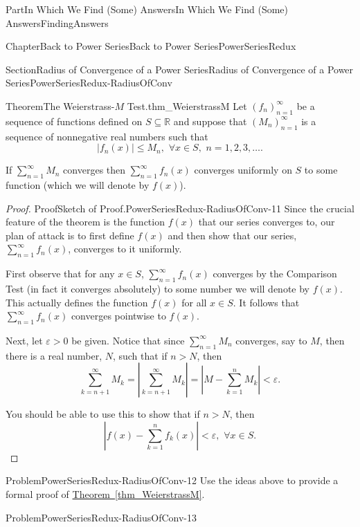 \documentclass[oneside,10pt,]{book}
\newcommand{\xreffont}{\relax}
\numberwithin{equation}{part}
\newcommand{\abs}[1]{\left|#1\right|}
\newcommand{\eps}{\varepsilon}
\newcommand{\RR}{\mathbb {R}}
\newcommand{\lt}{<}
\begin{document}
\begin{partptx}{Part}{In Which We Find (Some) Answers}{}{In Which We Find (Some) Answers}{}{}{FindingAnswers}
\begin{chapterptx}{Chapter}{Back to Power Series}{}{Back to Power Series}{}{}{PowerSeriesRedux}
\begin{sectionptx}{Section}{Radius of Convergence of a Power Series}{}{Radius of Convergence of a Power Series}{}{}{PowerSeriesRedux-RadiusOfConv}
\begin{theorem}{Theorem}{The Weierstrass-\(M\) Test.}{}{thm_WeierstrassM}%
 Let \(\left(f_n\right)_{n=1}^\infty\) be a sequence of functions defined on \(S\subseteq\RR\) and suppose that \(\left(M_n\right)_{n=1}^\infty\) is a sequence of nonnegative real numbers such that%
\begin{equation*}
\abs{f_n(x)}\leq M_n,\,\, \forall x\in S,\,\, n=1, 2, 3, \ldots\text{.}
\end{equation*}
%
\par
If \(\sum_{n=1}^\infty M_n\) converges then \(\sum_{n=1}^\infty f_n(x)\) converges uniformly on \(S\) to some function (which we will denote by \(f(x)\)).%
\end{theorem}
\begin{proof}{Proof}{Sketch of Proof.}{PowerSeriesRedux-RadiusOfConv-11}
Since the crucial feature of the theorem is the function \(f(x)\) that our series converges to, our plan of attack is to first define \(f(x)\) and then show that our series, \(\sum_{n=1}^\infty f_n(x)\), converges to it uniformly.%
\par
First observe that for any \(x\in S\), \(\sum_{n=1}^\infty
f_n(x)\) converges by the Comparison Test (in fact it converges absolutely) to some number we will denote by \(f(x)\).  This actually defines the function \(f(x)\) for all \(x\in S\).  It follows that \(\sum_{n=1}^\infty
f_n(x)\) converges pointwise to \(f(x)\).%
\par
Next, let \(\eps>0\) be given.  Notice that since \(\sum_{n=1}^\infty M_n\) converges, say to \(M\), then there is a real number, \(N\), such that if \(n>N\), then%
\begin{equation*}
\sum_{k=n+1}^\infty M_k = \abs{\sum_{k=n+1}^\infty M_k} = \abs{M-\sum_{k=1}^n M_k}\lt \eps\text{.}
\end{equation*}
%
\par
You should be able to use this to show that if \(n>N\), then%
\begin{equation*}
\abs{f(x) - \sum_{k=1}^n f_k(x)}\lt  \eps, \, \, \forall x\in S\text{.}
\end{equation*}
%
\end{proof}
\begin{problem}{Problem}{}{PowerSeriesRedux-RadiusOfConv-12}%
 Use the ideas above to provide a formal proof of \hyperref[thm_WeierstrassM]{Theorem~{\xreffont\ref{thm_WeierstrassM}}}.%
\end{problem}
\begin{problem}{Problem}{}{PowerSeriesRedux-RadiusOfConv-13}%

\end{problem}
\end{sectionptx}
\end{chapterptx}
\end{partptx}
\end{document}
